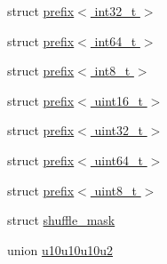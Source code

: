 \begin{DoxyCompactItemize}
\item 
struct \hyperlink{structglm_1_1detail_1_1prefix_3_01int32__t_01_4}{prefix$<$ int32\+\_\+t $>$}
\item 
struct \hyperlink{structglm_1_1detail_1_1prefix_3_01int64__t_01_4}{prefix$<$ int64\+\_\+t $>$}
\item 
struct \hyperlink{structglm_1_1detail_1_1prefix_3_01int8__t_01_4}{prefix$<$ int8\+\_\+t $>$}
\item 
struct \hyperlink{structglm_1_1detail_1_1prefix_3_01uint16__t_01_4}{prefix$<$ uint16\+\_\+t $>$}
\item 
struct \hyperlink{structglm_1_1detail_1_1prefix_3_01uint32__t_01_4}{prefix$<$ uint32\+\_\+t $>$}
\item 
struct \hyperlink{structglm_1_1detail_1_1prefix_3_01uint64__t_01_4}{prefix$<$ uint64\+\_\+t $>$}
\item 
struct \hyperlink{structglm_1_1detail_1_1prefix_3_01uint8__t_01_4}{prefix$<$ uint8\+\_\+t $>$}
\item 
struct \hyperlink{structglm_1_1detail_1_1shuffle__mask}{shuffle\+\_\+mask}
\item 
union \hyperlink{unionglm_1_1detail_1_1u10u10u10u2}{u10u10u10u2}
\end{DoxyCompactItemize}
